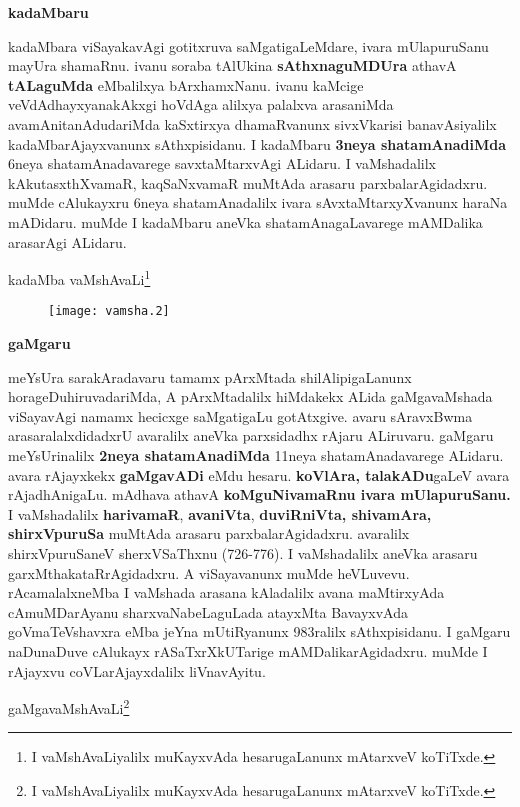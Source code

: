 \documentclass[11pt,a4size]{article}
\begin{document}
\bigskip
\centerline{\textbf{\Large kadaMbaru}}

\medskip
kadaMbara viSayakavAgi gotitxruva saMgatigaLeMdare, ivara mUlapuruSanu
mayUra shamaRnu. ivanu soraba tAlUkina \textbf{sAthxnaguMDUra} athavA
\textbf{tALaguMda} eMbalilxya bArxhamxNanu. ivanu kaMcige
veVdAdhayxyanakAkxgi hoVdAga alilxya palalxva arasaniMda
avamAnitanAdudariMda kaSxtirxya dhamaRvanunx sivxVkarisi
banavAsiyalilx kadaMbarAjayxvanunx sAthxpisidanu. I kadaMbaru
\textbf{3neya shatamAnadiMda} 6neya shatamAnadavarege savxtaMtarxvAgi
ALidaru. I vaMshadalilx kAkutasxthXvamaR, kaqSaNxvamaR muMtAda arasaru
parxbalarAgidadxru. muMde cAlukayxru 6neya shatamAnadalilx ivara
sAvxtaMtarxyXvanunx haraNa mADidaru. muMde I kadaMbaru aneVka
shatamAnagaLavarege mAMDalika arasarAgi ALidaru.

\medskip

\centerline{kadaMba vaMshAvaLi\footnote{I vaMshAvaLiyalilx muKayxvAda hesarugaLanunx
  mAtarxveV koTiTxde.}}
\begin{figure}[H]
\centering
\texttt{[image: vamsha.2]} 
\end{figure}


\bigskip
\centerline{\textbf{\Large gaMgaru}}

\medskip
meYsUra sarakAradavaru tamamx pArxMtada shilAlipigaLanunx
horageDuhiruvadariMda, A pArxMtadalilx hiMdakekx ALida gaMgavaMshada
viSayavAgi namamx hecicxge saMgatigaLu gotAtxgive. avaru sAravxBwma
arasaralalxdidadxrU avaralilx aneVka parxsidadhx rAjaru
ALiruvaru. gaMgaru meYsUrinalilx \textbf{2neya shatamAnadiMda} 11neya
shatamAnadavarege ALidaru. avara rAjayxkekx \textbf{gaMgavADi} eMdu
hesaru. \textbf{koVlAra, talakADu}gaLeV avara rAjadhAnigaLu. mAdhava
athavA \textbf{koMguNivamaRnu ivara mUlapuruSanu.} I vaMshadalilx
\textbf{harivamaR}, \textbf{avaniVta}, \textbf{duviRniVta, shivamAra, shirxVpuruSa}
muMtAda arasaru parxbalarAgidadxru. avaralilx shirxVpuruSaneV
sherxVSaThxnu (726-776). I vaMshadalilx aneVka arasaru
garxMthakataRrAgidadxru. A viSayavanunx muMde
heVLuvevu. rAcamalalxneMba I vaMshada arasana kAladalilx avana
maMtirxyAda cAmuMDarAyanu sharxvaNabeLaguLada atayxMta BavayxvAda
goVmaTeVshavxra eMba jeYna mUtiRyanunx 983ralilx sAthxpisidanu. I
gaMgaru naDunaDuve cAlukayx rASaTxrXkUTarige
mAMDalikarAgidadxru. muMde I rAjayxvu coVLarAjayxdalilx liVnavAyitu.

\medskip

\centerline{gaMgavaMshAvaLi\footnote{I vaMshAvaLiyalilx muKayxvAda hesarugaLanunx   mAtarxveV koTiTxde.}} 
\end{document}
